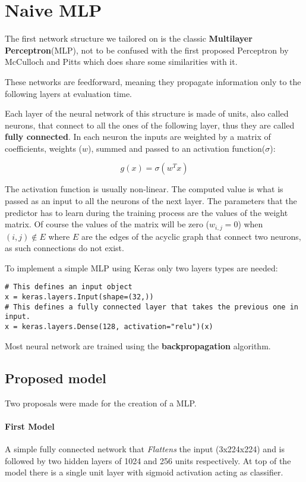\newpage


\section{Naive MLP}
\label{sec:naive-mlp}

The first network structure we tailored on is the classic \textbf{Multilayer Perceptron}(MLP), not to be confused with
the first proposed Perceptron by McCulloch and Pitts\cite{mcculloch43a} which does share some similarities with it.

These networks are feedforward, meaning they propagate information only to the following layers at evaluation time.

Each layer of the neural network of this structure is made of units, also called neurons, that connect
to all the ones of the following layer, thus they are called \textbf{fully connected}.
In each neuron the inputs are weighted by a matrix of coefficients, weights ($w$), summed and passed to an activation function($\sigma$):

\[g(x) = \sigma(w^Tx)\]

The activation function is usually non-linear. The computed value is what is passed as an input to all the neurons of the next layer.
The parameters that the predictor has to learn during the training process are the values of the weight matrix.
Of course the values of the matrix will be zero ($w_{i,j} = 0$) when $(i,j) \notin E$ where $E$ are the edges of the acyclic graph
that connect two neurons, as such connections do not exist.

To implement a simple MLP using Keras only two layers types are needed:
\begin{verbatim}
# This defines an input object
x = keras.layers.Input(shape=(32,))
# This defines a fully connected layer that takes the previous one in input.
x = keras.layers.Dense(128, activation="relu")(x)
\end{verbatim}
Most neural network are trained using the \textbf{backpropagation} algorithm.

\subsection{Proposed model}
Two proposals were made for the creation of a MLP.

\paragraph{First Model}
A simple fully connected network that \textit{Flattens} the input (3x224x224) and is followed by two hidden layers
of 1024 and 256 units respectively. At top of the model there is a single unit layer with sigmoid activation acting as classifier.

